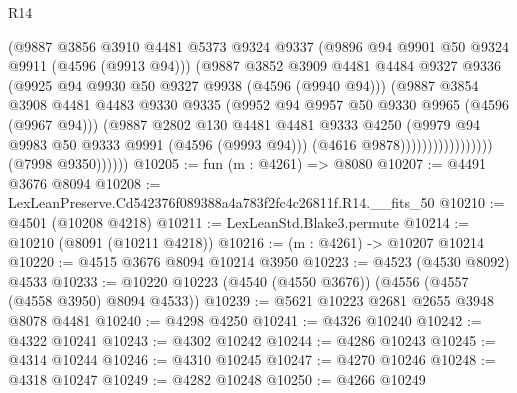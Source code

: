 \begin{lexlean}{R14}
\begin{coremodule}
                                      (@9887
                                        @3856
                                        @3910
                                        @4481
                                        @5373
                                        @9324
                                        @9337
                                        (@9896 @94 @9901 @50 @9324 @9911 (@4596 (@9913 @94)))
                                        (@9887
                                          @3852
                                          @3909
                                          @4481
                                          @4484
                                          @9327
                                          @9336
                                          (@9925 @94 @9930 @50 @9327 @9938 (@4596 (@9940 @94)))
                                          (@9887
                                            @3854
                                            @3908
                                            @4481
                                            @4483
                                            @9330
                                            @9335
                                            (@9952 @94 @9957 @50 @9330 @9965 (@4596 (@9967 @94)))
                                            (@9887
                                              @2802
                                              @130
                                              @4481
                                              @4481
                                              @9333
                                              @4250
                                              (@9979 @94 @9983 @50 @9333 @9991 (@4596 (@9993 @94)))
                                              (@4616 @9878)))))))))))))))))
              (@7998 @9350))))))
@10205 := fun (m : @4261) => @8080
@10207 := @4491 @3676 @8094
@10208 := LexLeanPreserve.Cd542376f089388a4a783f2fc4c26811f.R14.__fits_50
@10210 := @4501 (@10208 @4218)
@10211 := LexLeanStd.Blake3.permute
@10214 := @10210 (@8091 (@10211 @4218))
@10216 := (m : @4261) -> @10207 @10214
@10220 := @4515 @3676 @8094 @10214 @3950
@10223 := @4523 (@4530 @8092) @4533
@10233 := @10220 @10223 (@4540 (@4550 @3676)) (@4556 (@4557 (@4558 @3950) @8094 @4533))
@10239 := @5621 @10223 @2681 @2655 @3948 @8078 @4481
@10240 := @4298 @4250
@10241 := @4326 @10240
@10242 := @4322 @10241
@10243 := @4302 @10242
@10244 := @4286 @10243
@10245 := @4314 @10244
@10246 := @4310 @10245
@10247 := @4270 @10246
@10248 := @4318 @10247
@10249 := @4282 @10248
@10250 := @4266 @10249

\end{coremodule}
\end{lexlean}
